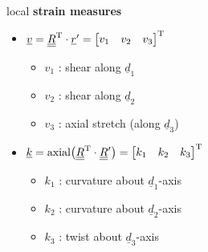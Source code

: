 \begin{frame}
  \vspace{0.6em}
  local \textbf{strain measures}
  \vspace{-1em}
  \begin{multicols}{2}
    \noindent  
    \begin{itemize}
      \item $\underline{v} = \underline{\underline{R}}^{\mathrm{T}} \cdot \underline{r}^{\prime} =
            \begin{bmatrix}
              v_1 & v_2 & v_3
            \end{bmatrix}^{\mathrm{T}}$
          \begin{itemize}
            \item $v_1$ : shear along $\underline{d}_1$
            \item $v_2$ : shear along $\underline{d}_2$
            \item $v_3$ : axial stretch (along $\underline{d}_3$)
          \end{itemize}
      \item $\underline{k} = \mathrm{axial} \bigl( \underline{\underline{R}}^{\mathrm{T}} \cdot \underline{\underline{R}}^{\prime} \bigr) =
            \begin{bmatrix}
              k_1 & k_2 & k_3
            \end{bmatrix}^{\mathrm{T}}$
          \begin{itemize}
            \item $k_1$ : curvature about $\underline{d}_1$-axis
            \item $k_2$ : curvature about $\underline{d}_2$-axis
            \item $k_3$ : twist about $\underline{d}_3$-axis
          \end{itemize}
    \end{itemize}
  \end{multicols}
\end{frame}


